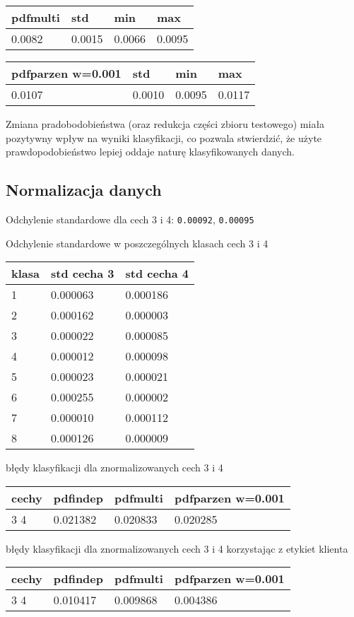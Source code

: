 \documentclass[11pt]{article}
\begin{document}
\begin{longtable}[]{@{}llll@{}}
\toprule
pdfmulti & std & min & max\tabularnewline
\midrule
\endhead
0.0082 & 0.0015 & 0.0066 & 0.0095\tabularnewline
\bottomrule
\end{longtable}

\begin{longtable}[]{@{}llll@{}}
\toprule
pdfparzen w=0.001 & std & min & max\tabularnewline
\midrule
\endhead
0.0107 & 0.0010 & 0.0095 & 0.0117\tabularnewline
\bottomrule
\end{longtable}

Zmiana pradobodobieństwa (oraz redukcja części zbioru testowego) miała
pozytywny wpływ na wyniki klasyfikacji, co pozwala stwierdzić, że użyte
prawdopodobieństwo lepiej oddaje naturę klasyfikowanych danych.

\subsection{Normalizacja danych}\label{normalizacja-danych}

Odchylenie standardowe dla cech 3 i 4: \texttt{0.00092},
\texttt{0.00095}

Odchylenie standardowe w poszczególnych klasach cech 3 i 4

\begin{longtable}[]{@{}lll@{}}
\toprule
klasa & std cecha 3 & std cecha 4\tabularnewline
\midrule
\endhead
1 & 0.000063 & 0.000186\tabularnewline
2 & 0.000162 & 0.000003\tabularnewline
3 & 0.000022 & 0.000085\tabularnewline
4 & 0.000012 & 0.000098\tabularnewline
5 & 0.000023 & 0.000021\tabularnewline
6 & 0.000255 & 0.000002\tabularnewline
7 & 0.000010 & 0.000112\tabularnewline
8 & 0.000126 & 0.000009\tabularnewline
\bottomrule
\end{longtable}

błędy klasyfikacji dla znormalizowanych cech 3 i 4

\begin{longtable}[]{@{}llll@{}}
\toprule
cechy & pdfindep & pdfmulti & pdfparzen w=0.001\tabularnewline
\midrule
\endhead
3 4 & 0.021382 & 0.020833 & 0.020285\tabularnewline
\bottomrule
\end{longtable}

błędy klasyfikacji dla znormalizowanych cech 3 i 4 korzystając z etykiet
klienta

\begin{longtable}[]{@{}llll@{}}
\toprule
cechy & pdfindep & pdfmulti & pdfparzen w=0.001\tabularnewline
\midrule
\endhead
3 4 & 0.010417 & 0.009868 & 0.004386\tabularnewline
\bottomrule
\end{longtable}
\end{document}
